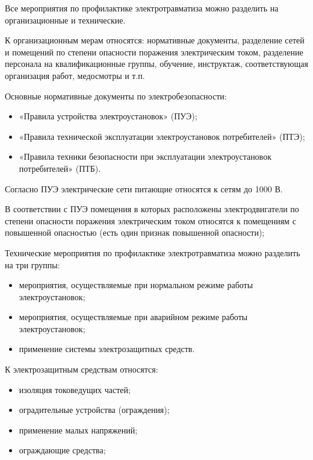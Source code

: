         Все мероприятия по профилактике электротравматиза можно разделить на
        организационные и технические.

        К организационным мерам относятся: нормативные документы, разделение
        сетей и помещений по степени опасности поражения электрическим током,
        разделение персонала на квалификационные группы, обучение, инструктаж,
        соответствующая организация работ, медосмотры и т.п.
    
        Основные нормативные документы по электробезопасности:
        \begin{itemize}
            \item «Правила устройства электроустановок» (ПУЭ);
            \item «Правила технической эксплуатации электроустановок
                потребителей» (ПТЭ);
            \item «Правила техники безопасности при эксплуатации
                электроустановок потребителей» (ПТБ).
        \end{itemize}

        Согласно ПУЭ электрические сети питающие относятся к сетям до 1000 В.

        В соответствии с ПУЭ помещения в которых расположены электродвигатели
        по степени опасности поражения электрическим током относятся к
        помещениям с повышенной опасностью (есть один признак повышенной
        опасности); 

        Технические мероприятия по профилактике электротравматиза можно
        разделить на три группы: 
        \begin{itemize}
            \item мероприятия, осуществляемые при нормальном режиме работы
                электроустановок;
            \item мероприятия, осуществляемые при аварийном режиме работы
                электроустановок;
            \item применение системы электрозащитных средств.
        \end{itemize}

        К электрозащитным средствам относятся:
        \begin{itemize}
            \item изоляция токоведущих частей;
            \item оградительные устройства (ограждения);
            \item применение малых напряжений;
            \item ограждающие средства;
        \end{itemize}

